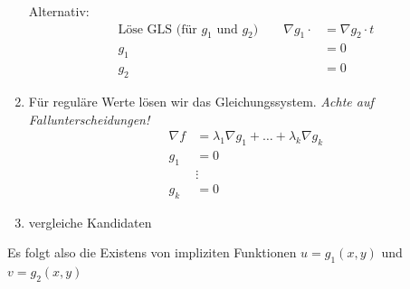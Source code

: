 \documentclass[a4paper]{article}
\begin{document}
\begin{fsatz}
\begin{enumerate}
					Alternativ:
					\begin{align*}
						\text{Löse GLS (für $g_1$ und $g_2$)}\qquad \nabla g_1 \cdot &= \nabla g_2 \cdot t\\
												g_1 &= 0\\
												g_2 &= 0
					\end{align*}
				\item Für reguläre Werte lösen wir das Gleichungssystem. \emph{Achte auf Fallunterscheidungen!}
					\begin{align*}
						\nabla f &= \lambda_1 \nabla g_1 + \ldots + \lambda_k \nabla g_k \\
						g_1 &= 0\\
						&\vdots\\
						g_k &= 0
					\end{align*}
				\item vergleiche Kandidaten
			\end{enumerate}
			Es folgt also die Existens von impliziten Funktionen $u= g_1(x,y)$ und $v =g_2(x,y)$
		\end{fsatz}

% 			
% 			
\end{document}
